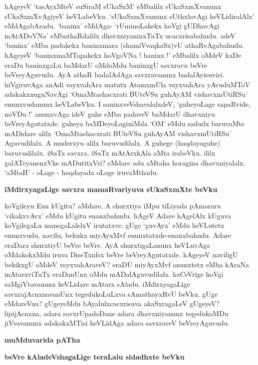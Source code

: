 \noindent
hAgeyeV `tasAyxMteV suSiraM sUkaSxM' eMbalilx sUkaSxmXvanunx sUkaSxmXvAgiyeV heVLabeVku. `sUkaSxmX\-vanunx sUthxlavAgi heVLidiralAlx' 
eMdAgabAradu. `baninx' eMdAga- `rUminoLakekx hoVgi gUDha\-vAgi mAtA\-DoVNa' eMbathaRdalilx dhavxniyaninxTuTx ucacxrisabahudu. adeV `baninx' eMba padakekx baninxmara (shamiV\-vaqkaSx)vU athaRvAgabahudu. hAgeyeV `baninxmaMTapakekx hoVgoVNa ! baninx !' eMbalilx oMdeV kaDe eraDu baninxgaLu baMdarU oMdoMdu baninxgU savxravu beVre beVreyAguvudu. AyA athaR bada\-lAdAga savxravanunx badalAyisuviri. hiVgiruvAga anAdi vayxvahAra matutx AtamxmUla vayxvahAra yAvu\-duMToV adakakxnuguNavAgi `OmaMtashacxrati BUteVSu guhAyAM vishavxmUtiRSu'\label{125} enunxvudanunx heVLa\-beVku. I saninxveVshavalalxdeV, `guheyoLage sapaRvide, noVDu !' anunxvAga ideV guhe eMba padaveV baMdarU dhavxniyu beVreyAgutatxde. guheya baMDeyoLaginiMda `OM' eMdu sadudx baruvaMte mADi\-dare alilx `OmaMtashacxrati BUteVSu guhAyAM vishavxmUtiRSu' Aguvudilalx. A muderxyu alilx baruvu\-dilalx. A guhege (haqdayaguhe) baruvudilalx. iSuTx savxra, iSuTx mAtArxkAla aMta irabeVku. ililx galATeyanenxVke mADutitxVri? eMdare adu aMtaha horagina dhavxniyalalx. `aMtaH' - oLage - haqdayada oLage iruvaMthadu.

{\bigskip
\noindent
{\large\bf iMdirxyagaLige savxra mamaRvariyuva sUkaSxmXte beVku}}\label{page125}
\medskip

\noindent
koVgileyu Enu kUgitu? aMdare, A shurxtiya iMpu tiLiyada pAmararu `cikakxvAvx' eMdu kUgitu enanxbahudu. hAgeV Adare hAgelAlx kUguva koVgilegaLu manegaLalelxV irutatxve. gUge `guvAyx' eMdu heVLutetx enunxvudu, navilu, bekukx miyAyxMvf enunxtatxde-enanxbahudu. Adare eraDara shurxti\-yU beVre beVre. AyA shurxtigaLanunx heVLuvAga oMdakokxMdu iruva DiseTxnfsx beVre beVreyAgutatxde. hAgeyeV naviligU bekikxgU oMdeV vayxvahAraveV? eraDU miyAyxMvf anunxtetx eMba kAraNa mAtarx\-viTuTx era\-DanUnx oMdu mADalAguvudilalx. kaCeVrige hoVgi saMgiVtavanunx keVLidare mAtarx sAladu. iMdirxya\-gaLige savxrajAcnxnavanUnx tegedukoLuLxva sAmathayxRvU beVku. gUge eMdareVnu? gUgeyeMdu bAya\-lulxcacx\-risuva akaSxragaLeV gUgeyeV? lipijAcnxna, adara savxrUpadoDane adara dhavxniyanunx tegedu\-koMDu jiVvavanunx adakakxMTisi heVLidAga adara savxraveV beVreyAguvudu. 

{\bigskip
\noindent
{\Large\bf muMduvarida pATha}}

{\bigskip
\noindent
{\large\bf beVre kAladeVshagaLige teraLalu sidadhxte beVku}}\label{page126}
\medskip

